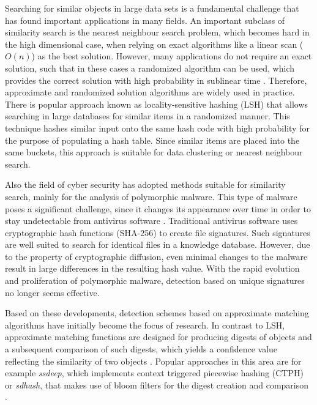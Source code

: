 \documentclass[../../main.tex]{subfiles}
\begin{document}
Searching for similar objects in large data sets is a fundamental challenge that has found important applications in many fields. An important subclass of similarity search is the nearest neighbour search problem, which becomes hard in the high dimensional case, when relying on exact algorithms like a linear scan ($O(n)$) as the best solution. However, many applications do not require an exact solution, such that in these cases a randomized algorithm can be used, which provides the correct solution with high probability in sublinear time \cite{datar_locality-sensitive_2004}. Therefore, approximate and randomized solution algorithms are widely used in practice. There is  popular approach known as locality-sensitive hashing (LSH) that allows searching in large databases for similar items in a randomized manner. This technique hashes similar input onto the same hash code with high probability for the purpose of populating a hash table. Since similar items are placed into the same buckets, this approach is suitable for data clustering or nearest neighbour search.


Also the field of cyber security has adopted methods suitable for similarity search, mainly for the analysis of polymorphic malware. This type of malware poses a significant challenge, since it changes its appearance over time in order to stay undetectable from antivirus software \cite[p.91]{whitman_principles_2018}. 
Traditional antivirus software uses cryptographic hash functions (SHA-256) to create file signatures. Such signatures are well suited to search for identical files in a knowledge database. However, due to the property of cryptographic diffusion, even minimal changes to the malware result in large differences in the resulting hash value. With the rapid evolution and proliferation of polymorphic malware, detection based on unique signatures no longer seems effective. 

Based on these developments, detection schemes based on approximate matching algorithms have initially become the focus of research. In contrast to LSH, approximate matching functions are designed for producing digests of objects and a subsequent comparison of such digests, which yields a confidence value reflecting the similarity of two objects \cite{moia_similarity_2017}. Popular approaches in this area are for example \textit{ssdeep}, which implements context triggered piecewise hashing (CTPH) \cite{kornblum_identifying_2006} or \textit{sdhash}, that makes use of bloom filters for the digest creation and comparison \cite{chow_data_2010}.
\end{document}
